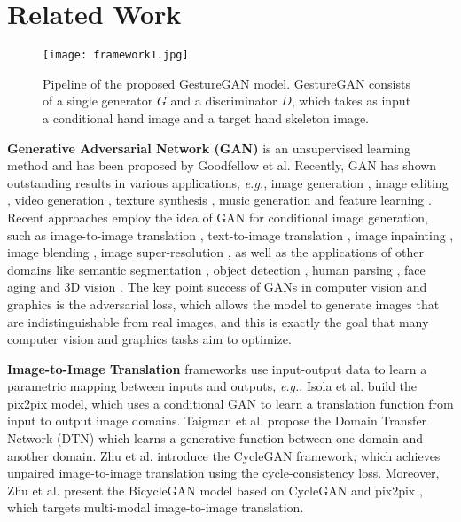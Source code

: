 \documentclass[sigconf]{acmart}
\begin{document}
\section{Related Work}
\label{sec:relatewprk}

\begin{figure*}[!t] \tiny
	\centering
\texttt{[image: framework1.jpg]}
	\caption{Pipeline of the proposed GestureGAN model. GestureGAN consists of a single generator $G$ and a discriminator $D$, which takes as input a conditional hand image and a target hand skeleton image. 
	}
	\label{fig:framework}
\end{figure*}

\noindent\textbf{Generative Adversarial Network (GAN)} \cite{goodfellow2014generative} is an unsupervised learning method and has been proposed by Goodfellow et al.
Recently, GAN has shown outstanding results in various applications, \textit{e.g.}, image generation \cite{karras2017progressive,berthelot2017began}, image editing \cite{shu2017neural,perarnau2016invertible}, video generation \cite{tulyakov2017mocogan,mathieu2015deep}, texture synthesis \cite{li2016precomputed}, music generation \cite{yang2017midinet} and feature learning \cite{xie2017controllable}.
Recent approaches employ the idea of GAN for conditional image generation, such as image-to-image translation \cite{isola2017image,wang2018high}, text-to-image translation \cite{reed2016generative,han2017stackgan}, image inpainting \cite{li2017generative,dolhansky2017eye},
image blending \cite{wu2017gp},  image super-resolution \cite{ledig2016photo}, as well as the applications of other domains like semantic segmentation \cite{luc2016semantic}, object detection \cite{li2017perceptual,wang2017fast}, human parsing \cite{liu2018cross}, face aging \cite{liu2017face} and 3D vision \cite{park2017transformation,wu2016learning}.
The key point success of GANs in computer vision and graphics is the adversarial loss, which allows the model to generate images that are  indistinguishable from real images, and this is exactly the goal that many computer vision and graphics tasks aim to optimize.

\noindent\textbf{Image-to-Image Translation} frameworks use input-output data to learn a parametric mapping between inputs and outputs, \textit{e.g.}, Isola et al. \cite{isola2017image} build the pix2pix model, which uses a conditional GAN to learn a translation function from input to output image domains.
Taigman et al. \cite{taigman2016unsupervised} propose the Domain Transfer Network (DTN) which learns a generative function between one domain and another domain.
Zhu et al. \cite{zhu2017unpaired} introduce the CycleGAN framework, which achieves unpaired image-to-image translation using the cycle-consistency loss.
Moreover, Zhu et al. \cite{zhu2017toward} present the BicycleGAN model based on CycleGAN \cite{zhu2017unpaired} and pix2pix \cite{isola2017image}, which targets multi-modal image-to-image translation.
\end{document}
